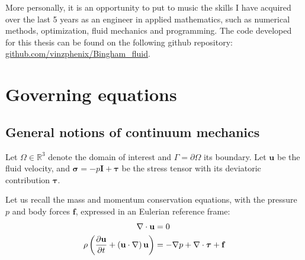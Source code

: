 \documentclass[11 pt]{report}
\begin{document}
More personally, it is an opportunity to put to music the skills I have acquired over the last 5 years as an engineer in applied mathematics, such as numerical methods, optimization, fluid mechanics and programming. The code developed for this thesis can be found on the following github repository: \url{github.com/vinzphenix/Bingham\_fluid}.

\chapter{Governing equations}
\label{chap:chapEq}

\section{General notions of continuum mechanics}
Let $\Omega \in \mathbb{R}^3$ denote the domain of interest and $\Gamma=\partial \Omega$ its boundary. Let $\mathbf{u}$ be the fluid velocity, and $\boldsymbol{\sigma}=-p\mathbf{I}+\boldsymbol{\tau}$ be the stress tensor with its deviatoric contribution $\boldsymbol\tau$.

Let us recall the mass and momentum conservation equations, with the pressure $p$ and body forces $\mathbf{f}$, expressed in an Eulerian reference frame:
\begin{align}
    \nabla \cdot \mathbf{u} &= 0\\
    \rho \left(\pdv{\mathbf{u}}{t} + \left(\mathbf{u} \cdot \nabla\right) \mathbf{u}\right) &= -\nabla p + \nabla \cdot \boldsymbol\tau + \mathbf{f}
\end{align}

\end{document}
